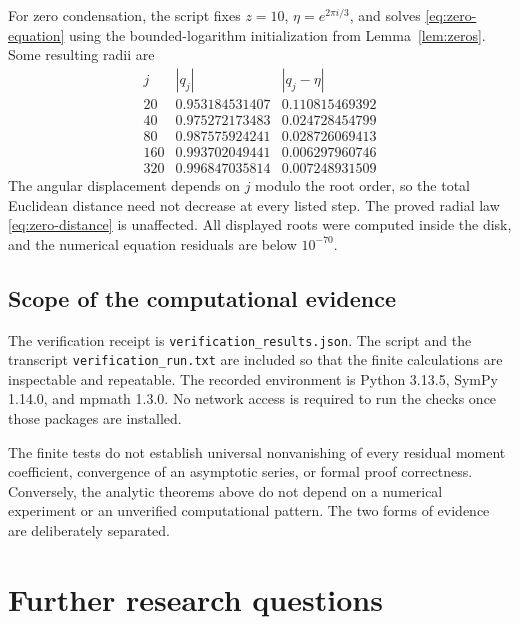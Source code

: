 \documentclass[11pt,a4paper]{article}
\numberwithin{equation}{section}
\theoremstyle{definition}
\theoremstyle{remark}
\begin{document}
For zero condensation, the script fixes \(z=10\), \(\eta=e^{2\pi i/3}\), and solves \eqref{eq:zero-equation} using the bounded-logarithm initialization from Lemma~\ref{lem:zeros}. Some resulting radii are
\[
 \begin{array}{r|c|c}
 j&|q_j|&|q_j-\eta|\\\hline
 20&0.953184531407&0.110815469392\\
 40&0.975272173483&0.024728454799\\
 80&0.987575924241&0.028726069413\\
 160&0.993702049441&0.006297960746\\
 320&0.996847035814&0.007248931509
 \end{array}
\]
The angular displacement depends on \(j\) modulo the root order, so the total Euclidean distance need not decrease at every listed step. The proved radial law \eqref{eq:zero-distance} is unaffected. All displayed roots were computed inside the disk, and the numerical equation residuals are below \(10^{-70}\).

\subsection{Scope of the computational evidence}
The verification receipt is \texttt{verification\_results.json}. The script and the transcript \texttt{verification\_run.txt} are included so that the finite calculations are inspectable and repeatable. The recorded environment is Python 3.13.5, SymPy 1.14.0, and mpmath 1.3.0. No network access is required to run the checks once those packages are installed.

The finite tests do not establish universal nonvanishing of every residual moment coefficient, convergence of an asymptotic series, or formal proof correctness. Conversely, the analytic theorems above do not depend on a numerical experiment or an unverified computational pattern. The two forms of evidence are deliberately separated.

\section{Further research questions}\label{sec:research}
\end{document}
